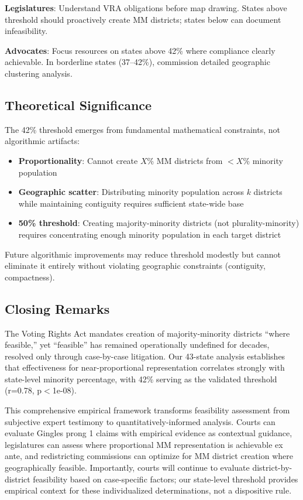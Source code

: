 \textbf{Legislatures}: Understand VRA obligations before map drawing. States above threshold should proactively create MM districts; states below can document infeasibility.

\textbf{Advocates}: Focus resources on states above 42\% where compliance clearly achievable. In borderline states (37--42\%), commission detailed geographic clustering analysis.

\subsection{Theoretical Significance}

The 42\% threshold emerges from fundamental mathematical constraints, not algorithmic artifacts:

\begin{itemize}
    \item \textbf{Proportionality}: Cannot create $X$\% MM districts from $<X$\% minority population
    \item \textbf{Geographic scatter}: Distributing minority population across $k$ districts while maintaining contiguity requires sufficient state-wide base
    \item \textbf{50\% threshold}: Creating majority-minority districts (not plurality-minority) requires concentrating enough minority population in each target district
\end{itemize}

Future algorithmic improvements may reduce threshold modestly but cannot eliminate it entirely without violating geographic constraints (contiguity, compactness).

\subsection{Closing Remarks}

The Voting Rights Act mandates creation of majority-minority districts ``where feasible,'' yet ``feasible'' has remained operationally undefined for decades, resolved only through case-by-case litigation. Our 43-state analysis establishes that effectiveness for near-proportional representation correlates strongly with state-level minority percentage, with 42\% serving as the validated threshold (r=0.78, p$<$1e-08).

This comprehensive empirical framework transforms feasibility assessment from subjective expert testimony to quantitatively-informed analysis. Courts can evaluate Gingles prong 1 claims with empirical evidence as contextual guidance, legislatures can assess where proportional MM representation is achievable ex ante, and redistricting commissions can optimize for MM district creation where geographically feasible. Importantly, courts will continue to evaluate district-by-district feasibility based on case-specific factors; our state-level threshold provides empirical context for these individualized determinations, not a dispositive rule.

